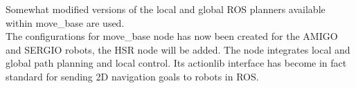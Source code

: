 Somewhat modified versions of the local and global ROS planners available within move\_base are used. \\The configurations for move\_base node has now been created for the AMIGO and SERGIO robots, the HSR node will be added. The node integrates local and global path planning and local control. Its actionlib interface has become in fact standard for sending 2D navigation goals to robots in ROS. 